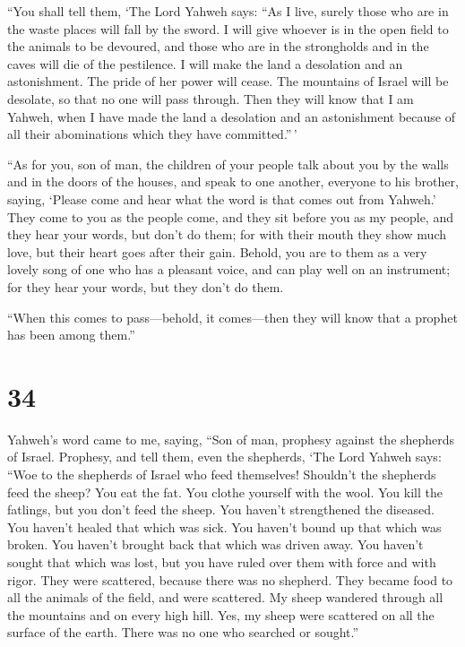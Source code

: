  ``You shall tell them, `The Lord Yahweh says: ``As I
live, surely those who are in the waste places will fall by the sword. I
will give whoever is in the open field to the animals to be devoured,
and those who are in the strongholds and in the caves will die of the
pestilence.  I will make the land a desolation and an
astonishment. The pride of her power will cease. The mountains of Israel
will be desolate, so that no one will pass through.  Then
they will know that I am Yahweh, when I have made the land a desolation
and an astonishment because of all their abominations which they have
committed.''\,'

 ``As for you, son of man, the children of your people
talk about you by the walls and in the doors of the houses, and speak to
one another, everyone to his brother, saying, `Please come and hear what
the word is that comes out from Yahweh.'  They come to
you as the people come, and they sit before you as my people, and they
hear your words, but don't do them; for with their mouth they show much
love, but their heart goes after their gain.  Behold, you
are to them as a very lovely song of one who has a pleasant voice, and
can play well on an instrument; for they hear your words, but they don't
do them.

 ``When this comes to pass---behold, it comes---then they
will know that a prophet has been among them.''

\hypertarget{section-33}{%
\section{34}\label{section-33}}

 Yahweh's word came to me, saying,  ``Son of
man, prophesy against the shepherds of Israel. Prophesy, and tell them,
even the shepherds, `The Lord Yahweh says: ``Woe to the shepherds of
Israel who feed themselves! Shouldn't the shepherds feed the sheep?
 You eat the fat. You clothe yourself with the wool. You
kill the fatlings, but you don't feed the sheep.  You
haven't strengthened the diseased. You haven't healed that which was
sick. You haven't bound up that which was broken. You haven't brought
back that which was driven away. You haven't sought that which was lost,
but you have ruled over them with force and with rigor. 
They were scattered, because there was no shepherd. They became food to
all the animals of the field, and were scattered.  My
sheep wandered through all the mountains and on every high hill. Yes, my
sheep were scattered on all the surface of the earth. There was no one
who searched or sought.''

